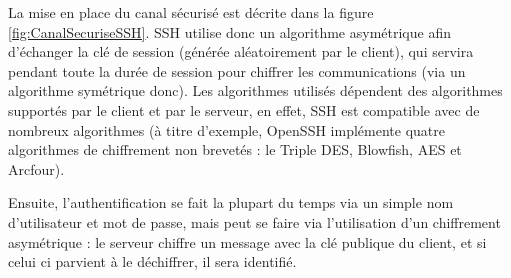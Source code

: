 La mise en place du canal sécurisé est décrite dans la figure
\ref{fig:CanalSecuriseSSH}. SSH utilise donc un algorithme asymétrique
afin d'échanger la clé de session (générée aléatoirement par le
client), qui servira pendant toute la
durée de session pour chiffrer les communications (via un
algorithme symétrique donc). Les algorithmes utilisés dépendent
des algorithmes supportés par le client et par le serveur, en
effet, SSH est compatible avec de nombreux algorithmes (à titre
d'exemple, OpenSSH implémente quatre algorithmes de chiffrement non
brevetés : le Triple DES, Blowfish, AES et Arcfour).

 
\begin{figure}[h]
\vspace{-10pt}
  \centering
    \hspace{1.2cm}
\end{figure}

Ensuite, l'authentification se fait la plupart du temps via un
simple nom d'utilisateur et mot de passe, mais peut se faire via
l'utilisation d'un chiffrement asymétrique : le serveur chiffre un message 
avec la clé
publique du client, et si celui ci parvient à le déchiffrer, il
sera identifié.
